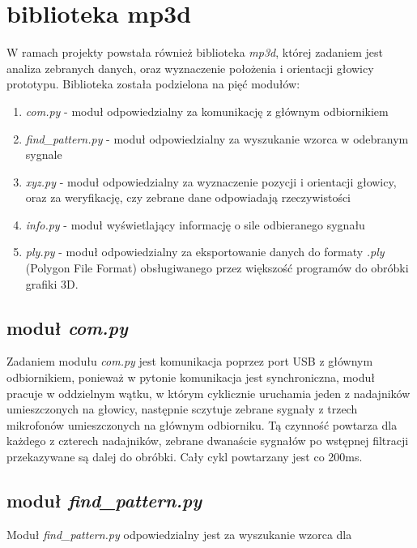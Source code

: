 \chapter{biblioteka mp3d}


W ramach projekty powstała również biblioteka \textit{mp3d}, której zadaniem jest analiza zebranych danych,
oraz wyznaczenie położenia i orientacji głowicy prototypu.
Biblioteka została podzielona na pięć modułów:
\begin{enumerate}

 \item \textit{com.py} - moduł odpowiedzialny za komunikację z głównym odbiornikiem
 \item \textit{find\_pattern.py} - moduł odpowiedzialny za wyszukanie wzorca w odebranym sygnale
 \item \textit{xyz.py} - moduł odpowiedzialny za wyznaczenie pozycji i orientacji głowicy, oraz za 
 weryfikację, czy zebrane dane odpowiadają rzeczywistości
 \item \textit{info.py} - moduł wyświetlający informację o sile odbieranego sygnału
 \item \textit{ply.py} - moduł odpowiedzialny za eksportowanie danych do formaty \textit{.ply} 
    (Polygon File Format) obsługiwanego przez większość programów do obróbki grafiki 3D.

\end{enumerate}


\section{moduł \textit{com.py}}

Zadaniem modułu \textit{com.py} jest komunikacja poprzez port USB z głównym odbiornikiem,
ponieważ w pytonie komunikacja jest synchroniczna, moduł pracuje w oddzielnym wątku, w którym cyklicznie 
uruchamia jeden z nadajników umieszczonych na głowicy,
następnie sczytuje zebrane sygnały z trzech mikrofonów umieszczonych na głównym odbiorniku.
Tą czynność powtarza dla każdego z czterech nadajników, zebrane dwanaście sygnałów 
po wstępnej filtracji przekazywane są dalej do obróbki. Cały cykl powtarzany jest
co 200ms.

\section{moduł \textit{find\_pattern.py}}

Moduł \textit{find\_pattern.py} odpowiedzialny jest za wyszukanie wzorca dla 
